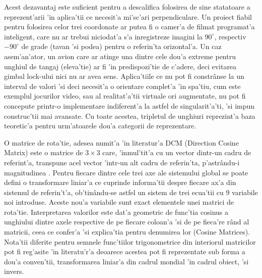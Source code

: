 \documentclass[12pt,a4paper,twoside]{report}
\begin{document}
\vspace{5px}

Acest dezavantaj este suficient pentru a descalifica folosirea de sine statatoare a reprezent'arii 'in aplica'tii ce necesit'a mi'sc'ari perpendiculare. Un proiect fiabil pentru folosirea celor trei coordonate ar putea fi o camer'a de filmat programat'a inteligent, care nu ar trebui niciodat'a s'a inregistreze imagini la $90^\circ$, respectiv $-90^\circ$ de grade (tavan 'si podea) pentru o referin'ta orizontal'a. Un caz asem'an'ator, un avion care ar atinge una dintre cele dou'a extreme pentru unghiul de tangaj (eleva'tie) ar fi 'in predispozi'tie de c'adere, deci evitarea gimbal lock-ului nici nu ar avea sens. Aplica'tiile ce nu pot fi constr\^{a}nse la un interval de valori 'si deci necesit'a o orientare complet'a 'in spa'tiu, cum este exemplul jocurilor video, sau al realitat'a'tii virtuale ori augmentate, nu pot fi concepute printr-o implementare indiferent'a la astfel de singularit'a'ti, 'si impun construc'tii mai avansate. Cu toate acestea, tripletul de unghiuri reprezint'a baza teoretic'a pentru urm'atoarele dou'a categorii de reprezentare.  

\vspace{5px}

O matrice de rota'tie, adesea numit'a 'in literatur'a DCM (Direction Cosine Matrix) este o matrice de $3\times3$ care, 'inmul'tit'a cu un vector dintr-un cadru de referint'a, transpune acel vector 'intr-un alt cadru de referin'ta, p'astr\^{a}ndu-i magnitudinea \cite{article3}. Pentru fiecare dintre cele trei axe ale sistemului global se poate defini o transformare liniar'a ce cuprinde informa'tii despre fiecare ax'a din sistemul de referin't'a, ob'tin\^{a}ndu-se astfel un sistem de trei ecua'tii cu 9 variabile noi introduse. Aceste nou'a variabile sunt exact elementele unei matrici de rota'tie. Interpretarea valorilor este dat'a geometric de func'tia cosinus a unghiului dintre axele respective de pe fiecare coloan'a 'si de pe fieca're r\^{a}nd al matricii, ceea ce confer'a 'si explica'tia pentru denumirea lor (Cosine Matrices). Nota'tii diferite pentru semnele func'tiilor trigonometrice din interiorul matricilor pot fi reg'asite 'in literatu'r'a deoarece acestea pot fi reprezentate sub forma a dou'a conven'tii, transformarea liniar'a din cadrul mondial 'in cadrul obiect, 'si invers.

\vspace{5px}
\end{document}

